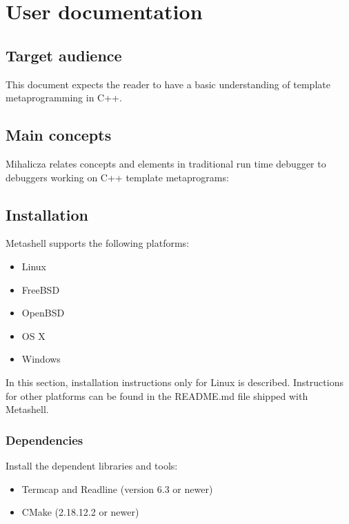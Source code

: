 

\chapter{User documentation}

\section{Target audience}

This document expects the reader to have a basic understanding of template
metaprogramming in C++.


\section{Main concepts}

Mihalicza relates concepts and elements in traditional run time debugger to
debuggers working on C++ template metaprograms\cite{mihalicza-phd}:


\section{Installation}

Metashell supports the following platforms:
\begin{itemize}
    \item Linux
    \item FreeBSD
    \item OpenBSD
    \item OS X
    \item Windows
\end{itemize}

In this section, installation instructions only for Linux is described.
Instructions for other platforms can be found in the README.md file shipped
with Metashell.

\subsection{Dependencies}

Install the dependent libraries and tools:

\begin{itemize}
    \item Termcap and Readline (version 6.3 or newer)
    \item CMake (2.18.12.2 or newer)
\end{itemize}

